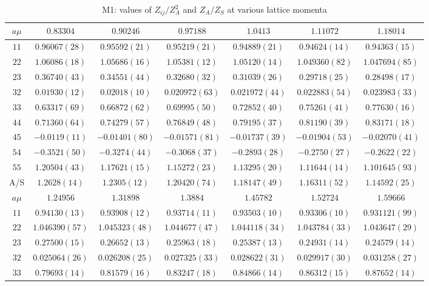 \begin{table}
\begin{center}
\caption{M1: values of $Z_{ij}/Z_A^2$ and $Z_A/Z_S$ at various lattice momenta}
\begin{tabular}{c|c c c c c c}
\hline
\hline
$a\mu$ & $0.83304$ & $0.90246$ & $0.97188$ & $1.0413$ & $1.11072$ & $1.18014$ \\
\hline
$11$ & $0.96067(28)$ & $0.95592(21)$ & $0.95219(21)$ & $0.94889(21)$ & $0.94624(14)$ & $0.94363(15)$ \\
$22$ & $1.06086(18)$ & $1.05686(16)$ & $1.05381(12)$ & $1.05120(14)$ & $1.049360(82)$ & $1.047694(85)$ \\
$23$ & $0.36740(43)$ & $0.34551(44)$ & $0.32680(32)$ & $0.31039(26)$ & $0.29718(25)$ & $0.28498(17)$ \\
$32$ & $0.01930(12)$ & $0.02018(10)$ & $0.020972(63)$ & $0.021972(44)$ & $0.022883(54)$ & $0.023983(33)$ \\
$33$ & $0.63317(69)$ & $0.66872(62)$ & $0.69995(50)$ & $0.72852(40)$ & $0.75261(41)$ & $0.77630(16)$ \\
$44$ & $0.71360(64)$ & $0.74279(57)$ & $0.76849(48)$ & $0.79195(37)$ & $0.81190(39)$ & $0.83171(18)$ \\
$45$ & $-0.0119(11)$ & $-0.01401(80)$ & $-0.01571(81)$ & $-0.01737(39)$ & $-0.01904(53)$ & $-0.02070(41)$ \\
$54$ & $-0.3521(50)$ & $-0.3274(44)$ & $-0.3068(37)$ & $-0.2893(28)$ & $-0.2750(27)$ & $-0.2622(22)$ \\
$55$ & $1.20504(43)$ & $1.17621(15)$ & $1.15272(23)$ & $1.13295(20)$ & $1.11644(14)$ & $1.101645(93)$ \\
\hline
A/S & $1.2628(14)$ & $1.2305(12)$ & $1.20420(74)$ & $1.18147(49)$ & $1.16311(52)$ & $1.14592(25)$ \\
\hline
$a\mu$ & $1.24956$ & $1.31898$ & $1.3884$ & $1.45782$ & $1.52724$ & $1.59666$ \\
\hline
$11$ & $0.94130(13)$ & $0.93908(12)$ & $0.93714(11)$ & $0.93503(10)$ & $0.93306(10)$ & $0.931121(99)$ \\
$22$ & $1.046390(57)$ & $1.045323(48)$ & $1.044677(47)$ & $1.044118(34)$ & $1.043784(33)$ & $1.043647(29)$ \\
$23$ & $0.27500(15)$ & $0.26652(13)$ & $0.25963(18)$ & $0.25387(13)$ & $0.24931(14)$ & $0.24579(14)$ \\
$32$ & $0.025064(26)$ & $0.026208(25)$ & $0.027325(33)$ & $0.028622(31)$ & $0.029917(30)$ & $0.031258(27)$ \\
$33$ & $0.79693(14)$ & $0.81579(16)$ & $0.83247(18)$ & $0.84866(14)$ & $0.86312(15)$ & $0.87652(14)$ \\

\end{tabular}
\end{center}
\end{table}
